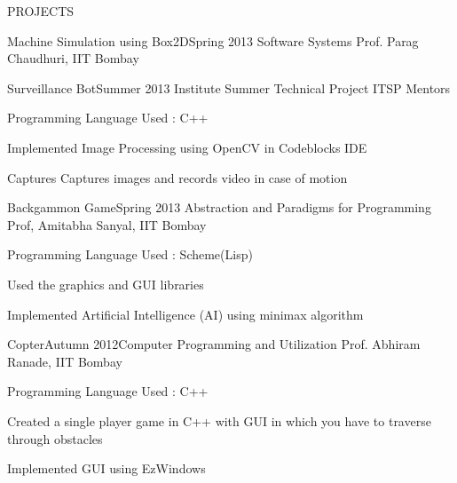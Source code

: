 \documentclass{resume} %
\begin{document}
\begin{rSection}{PROJECTS}
\begin{rSubsection}{Machine Simulation using Box2D}{Spring 2013}{ Software Systems }{ Prof. Parag Chaudhuri, IIT Bombay}
\end{rSubsection}


\begin{rSubsection}{Surveillance Bot}{Summer 2013}{ Institute Summer Technical Project }{ ITSP Mentors}
\item Programming Language Used : C++
\item Implemented Image Processing using OpenCV in Codeblocks IDE
\item Captures Captures images and records video in case of motion
\end{rSubsection}


\begin{rSubsection}{Backgammon Game}{Spring 2013}{ Abstraction and Paradigms for Programming }{ Prof, Amitabha Sanyal, IIT Bombay}
\item Programming Language Used : Scheme(Lisp)
\item Used the graphics and GUI libraries
\item Implemented Artificial Intelligence (AI) using minimax algorithm
\end{rSubsection}


\begin{rSubsection}{Copter}{Autumn 2012}{Computer Programming and Utilization }{ Prof. Abhiram Ranade, IIT Bombay}
\item Programming Language Used : C++
\item Created a single player game in C++ with GUI in which you have to traverse through obstacles
\item Implemented GUI using EzWindows
\end{rSubsection}

\end{rSection}

\end{document}
